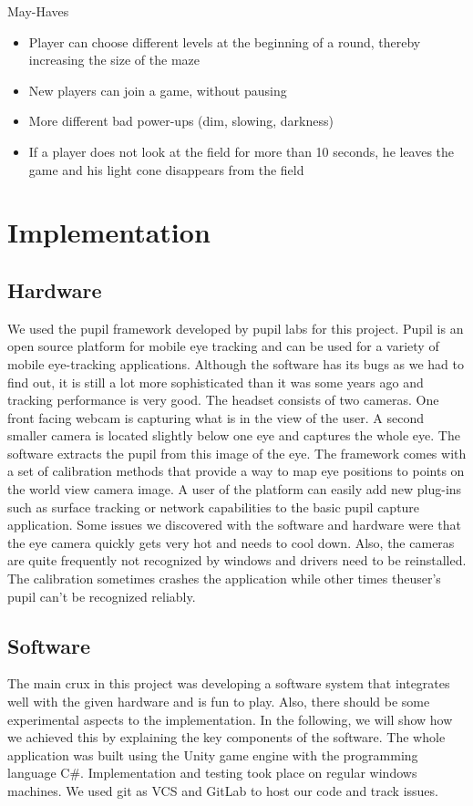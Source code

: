 \documentclass{sigchi}
\begin{document}
	May-Haves
	\begin{itemize}
		\item Player can choose different levels at the beginning of a round, thereby increasing the size of the maze
		\item New players can join a game, without pausing 
		\item More different bad power-ups (dim, slowing, darkness)
		\item If a player does not look at the field for more than 10 seconds, he leaves the game and his light cone disappears from the field
		
	\end{itemize}

\section{Implementation}
\subsection{Hardware}
We used the pupil framework developed by pupil labs \cite{kassner2014pupil} for this project. Pupil is an open source platform for mobile eye tracking and can be used for a variety of mobile eye-tracking applications. Although the software has its bugs as we had to find out, it is still a lot more sophisticated than it was some years ago and tracking performance is very good. The headset consists of two cameras. One front facing webcam is capturing what is in the view of the user. A second smaller camera is located slightly below one eye and captures the whole eye. The software extracts the pupil from this image of the eye. The framework comes with a set of calibration methods that provide a way to map eye positions to points on the world view camera image. A user of the platform can easily add new plug-ins such as surface tracking or network capabilities to the basic pupil capture application. Some issues we discovered with the software and hardware were that the eye camera quickly gets very hot and needs to cool down. Also, the cameras are quite frequently not recognized by windows and drivers need to be reinstalled. The calibration sometimes crashes the application while other times theuser's pupil can't be recognized reliably.

\subsection{Software}
The main crux in this project was developing a software system that integrates well with the given hardware and is fun to play. Also, there should be some experimental aspects to the implementation. In the following, we will show how we achieved this by explaining the key components of the software. The whole application was built using the Unity game engine with the programming language C\#. Implementation and testing took place on regular windows machines. We used git as VCS and GitLab to host our code and track issues.
\end{document}
